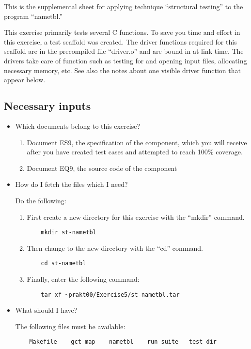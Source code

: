 
This is the supplemental sheet 
for applying technique ``structural testing''
to the program ``nametbl.'' 

\bigskip

This exercise primarily tests several C functions.
To save you time and effort in this exercise, a test scaffold was
created. 
The driver functions required for this scaffold are in the precompiled
file ``driver.o'' and are bound in at link time.
The drivers take care of function such as testing for and opening
input files, allocating necessary memory, etc.  See also the notes
about one visible driver function that appear below.


\subsection*{Necessary inputs}

\begin{itemize}

\item Which documents belong to this exercise?

\begin{enumerate}
\item Document ES9, the specification of the component, which you will
receive after you have created test cases and attempted to reach 100\%
coverage.
\item Document EQ9, the source code of the component
\end{enumerate}

\item How do I fetch the files which I need?

Do the following:

\begin{enumerate}

\item First create a new directory for this exercise with the
``mkdir'' command.
\begin{verbatim}
    mkdir st-nametbl
\end{verbatim}

\item Then change to the new directory with the ``cd'' command.
\begin{verbatim}
    cd st-nametbl
\end{verbatim}

\item Finally, enter the following command:
\begin{path}
\begin{verbatim}
    tar xf ~prakt00/Exercise5/st-nametbl.tar
\end{verbatim}
\end{path}

\end{enumerate}

\item What should I have?

The following files must be available:
\begin{verbatim}
    Makefile    gct-map    nametbl    run-suite   test-dir
\end{verbatim}

\end{itemize}


